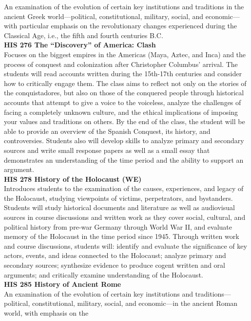 \documentclass[
  letterpaper,
]{scrbook}
\begin{document}
An examination of the evolution of certain key institutions and
traditions in the ancient Greek world---political, constitutional,
military, social, and economic---with particular emphasis on the
revolutionary changes experienced during the Classical Age, i.e., the
fifth and fourth centuries B.C.\\
\textbf{HIS 276 The ``Discovery'' of America: Clash}\\
Focuses on the biggest empires in the Americas (Maya, Aztec, and Inca)
and the process of conquest and colonization after Christopher Columbus'
arrival. The students will read accounts written during the 15th-17th
centuries and consider how to critically engage them. The class aims to
reflect not only on the stories of the conquistadores, but also on those
of the conquered people through historical accounts that attempt to give
a voice to the voiceless, analyze the challenges of facing a completely
unknown culture, and the ethical implications of imposing your values
and traditions on others. By the end of the class, the student will be
able to provide an overview of the Spanish Conquest, its history, and
controversies. Students also will develop skills to analyze primary and
secondary sources and write small response papers as well as a small
essay that demonstrates an understanding of the time period and the
ability to support an argument.\\
\textbf{HIS 278 History of the Holocaust (WE)}\\
Introduces students to the examination of the causes, experiences, and
legacy of the Holocaust, studying viewpoints of victims, perpetrators,
and bystanders. Students will study historical documents and literature
as well as audiovisual sources in course discussions and written work as
they cover social, cultural, and political history from pre-war Germany
through World War II, and evaluate memory of the Holocaust in the time
period since 1945. Through written work and course discussions, students
will: identify and evaluate the significance of key actors, events, and
ideas connected to the Holocaust; analyze primary and secondary sources;
synthesize evidence to produce cogent written and oral arguments; and
critically examine understanding of the Holocaust.\\
\textbf{HIS 285 History of Ancient Rome}\\
An examination of the evolution of certain key institutions and
traditions---political, constitutional, military, social, and
economic---in the ancient Roman world, with emphasis on the
\end{document}
